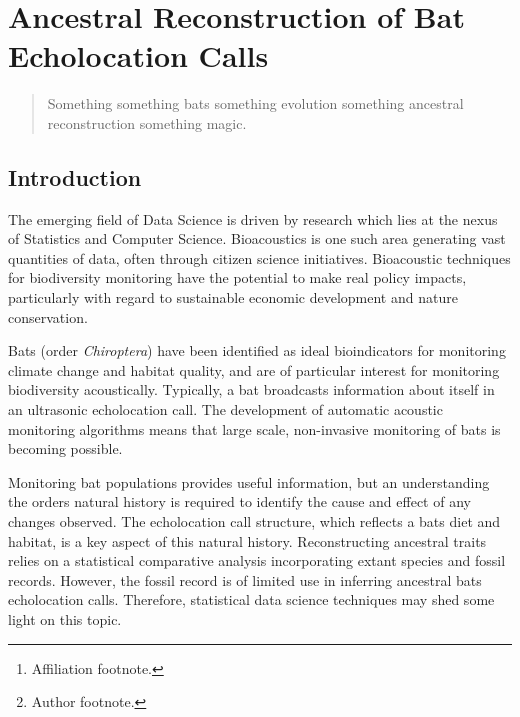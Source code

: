 \documentclass[wsdraft]{ws-rv9x6} %
\begin{document}
\chapter[Ancestral Reconstruction of Bat Echolocation Calls]{Ancestral Reconstruction of Bat Echolocation Calls}\label{ra_ch1}

\author[J.P. Meagher et al.]{J.P. Meagher\footnote{Author footnote.}}

\address{Department of Statistics,\\
University of Warwick, \\
J.Meagher@Warwick.ac.uk\footnote{Affiliation footnote.}}

\begin{abstract}
 Something something bats something evolution something ancestral reconstruction something magic.
\end{abstract}
\body

\section{Introduction}
The emerging field of Data Science is driven by research which lies at the nexus of Statistics and Computer Science. Bioacoustics is one such area generating vast quantities of data, often through citizen science initiatives. \cite{allen2006citizen} \cite{pettorelli2013indicator} Bioacoustic techniques for biodiversity monitoring \cite{stathopoulos2017bat} \cite{damoulas2010bayesian} have the potential to make real policy impacts, particularly with regard to sustainable economic development and nature conservation.

Bats (order \textit{Chiroptera}) have been identified as ideal bioindicators for monitoring climate change and habitat quality,\cite{jones2009carpe} and are of particular interest for monitoring biodiversity acoustically. Typically, a bat broadcasts information about itself in an ultrasonic echolocation call.\cite{griffin1944echolocation} The development of automatic acoustic monitoring algorithms \cite{stathopoulos2017bat} \cite{walters2012continental} means that large scale, non-invasive monitoring of bats is becoming possible.   

Monitoring bat populations provides useful information, but an understanding the orders natural history is required to identify the cause and effect of any changes observed. The echolocation call structure, which reflects a bats diet and habitat,\cite{aldridge1987morphology}  is a key aspect of this natural history. Reconstructing ancestral traits\cite{joy2016ancestral} relies on a statistical comparative analysis incorporating extant species and fossil records. \cite{felsenstein2004inferring} However, the fossil record is of limited use in inferring ancestral bats echolocation calls. Therefore, statistical data science techniques may shed some light on this topic.
\end{document}
